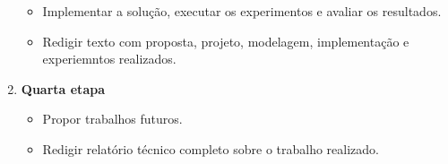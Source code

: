 \documentclass[a4paper, 10pt]{article}
\begin{document}
\begin{enumerate}
\begin{itemize}
  \item Implementar a solução, executar os experimentos e avaliar os resultados.
  \item Redigir texto com proposta, projeto, modelagem, implementação e experiemntos  realizados.
\end{itemize}
\item {\bf Quarta etapa} %
\begin{itemize}
  \item Propor trabalhos futuros.
  \item Redigir relatório técnico completo sobre o trabalho realizado. 
\end{itemize}
\end{enumerate}

\end{document}
